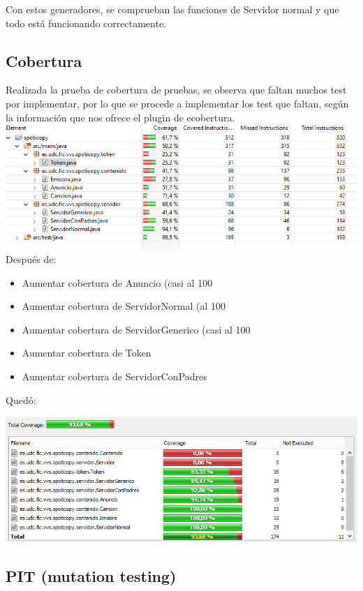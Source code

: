 \documentclass[12pt, a4paper, titlepage]{article}
\begin{document}
	Con estos generadores, se comprueban las funciones de Servidor normal y que todo está funcionando correctamente.
	
	\subsection{Cobertura}
	Realizada la prueba de cobertura de pruebas, se observa que faltan muchos test por implementar, por lo que se procede a implementar los test que faltan, según la información que nos ofrece el plugin de ecobertura.\\
	\includegraphics[width=15cm]{Imagenes/CoberturaSemana1.png} \\
	
	Después de:
	\begin{itemize}
		\item Aumentar cobertura de Anuncio (casi al 100%
		\item Aumentar cobertura de ServidorNormal (al 100%
		\item Aumentar cobertura de ServidorGenerico (casi al 100%
		\item Aumentar cobertura de Token 
		\item Aumentar cobertura de ServidorConPadres
	\end{itemize}
	
	Quedó:
	
	\includegraphics[width=15cm]{Imagenes/CoberturaSemana2.png} \\
	
	\subsection{PIT (mutation testing)}
	
\end{document}
